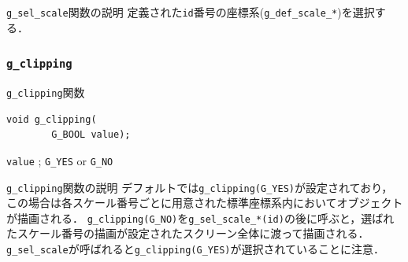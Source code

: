 \documentclass[platex,a4paper,12pt]{jsarticle}%
\begin{document}
\begin{itembox}[l]{\texttt{g\_sel\_scale}関数の説明}
定義された\verb|id|番号の座標系(\verb|g_def_scale_*|)を選択する．
\end{itembox}








\subsubsection{\texttt{g\_clipping}}

\begin{itembox}[l]{\texttt{g\_clipping}関数}
\begin{verbatim}
void g_clipping(
        G_BOOL value);
\end{verbatim}
\verb|value| ; \verb|G_YES| or \verb|G_NO|
\end{itembox}

\begin{itembox}[l]{\texttt{g\_clipping}関数の説明}
デフォルトでは\verb|g_clipping(G_YES)|が設定されており，この場合は各スケール番号ごとに用意された標準座標系内においてオブジェクトが描画される．
\verb|g_clipping(G_NO)|を\verb|g_sel_scale_*(id)|の後に呼ぶと，選ばれたスケール番号の描画が設定されたスクリーン全体に渡って描画される．
\verb|g_sel_scale|が呼ばれると\verb|g_clipping(G_YES)|が選択されていることに注意．
\end{itembox}
\end{document}
